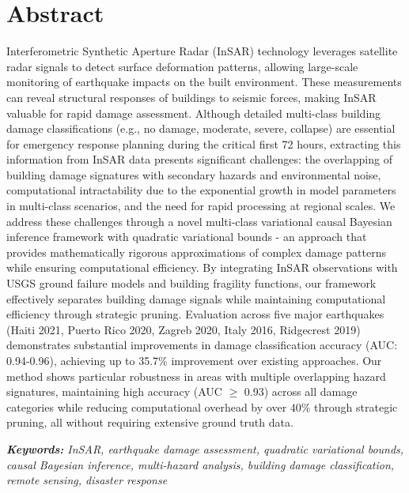 \documentclass[review]{elsarticle}
\begin{document}
\section*{Abstract}
Interferometric Synthetic Aperture Radar (InSAR) technology leverages satellite radar signals to detect surface deformation patterns, allowing large-scale monitoring of earthquake impacts on the built environment. These measurements can reveal structural responses of buildings to seismic forces, making InSAR valuable for rapid damage assessment. Although detailed multi-class building damage classifications (e.g., no damage, moderate, severe, collapse) are essential for emergency response planning during the critical first 72 hours, extracting this information from InSAR data presents significant challenges: the overlapping of building damage signatures with secondary hazards and environmental noise, computational intractability due to the exponential growth in model parameters in multi-class scenarios, and the need for rapid processing at regional scales. We address these challenges through a novel multi-class variational causal Bayesian inference framework with quadratic variational bounds - an approach that provides mathematically rigorous approximations of complex damage patterns while ensuring computational efficiency. By integrating InSAR observations with USGS ground failure models and building fragility functions, our framework effectively separates building damage signals while maintaining computational efficiency through strategic pruning. Evaluation across five major earthquakes (Haiti 2021, Puerto Rico 2020, Zagreb 2020, Italy 2016, Ridgecrest 2019) demonstrates substantial improvements in damage classification accuracy (AUC: 0.94-0.96), achieving up to 35.7\% improvement over existing approaches. Our method shows particular robustness in areas with multiple overlapping hazard signatures, maintaining high accuracy (AUC $\geq$ 0.93) across all damage categories while reducing computational overhead by over 40\% through strategic pruning, all without requiring extensive ground truth data.


\noindent \textit{\textbf{Keywords:} InSAR, earthquake damage assessment, quadratic variational bounds, causal Bayesian inference, multi-hazard analysis, building damage classification, remote sensing, disaster response }
\end{document}
